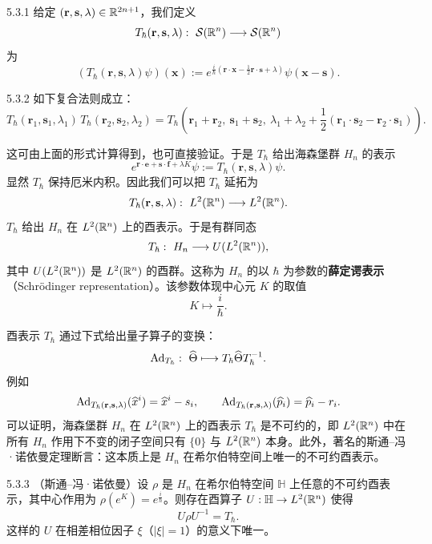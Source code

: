 \begin{definition}{5.3.1}
  给定 $(\mathbf r,\mathbf s,\lambda)\in\mathbb{R}^{2n+1}$，我们定义
  \[
  T_\hbar(\mathbf r,\mathbf s,\lambda):\ \mathcal{S}(\R^n)\longrightarrow\mathcal{S}(\R^n)
  \]
  为
  \[
  (T_\hbar(\mathbf r,\mathbf s,\lambda)\psi)(\mathbf x)
  :=e^{\frac{i}{\hbar}\left(\mathbf r\cdot\mathbf x-\frac{1}{2}\mathbf r\cdot\mathbf s+\lambda\right)}
  \psi(\mathbf x-\mathbf s).
  \]
\end{definition}

\begin{proposition}{5.3.2}
  如下复合法则成立：
  \[
  T_\hbar(\mathbf r_1,\mathbf s_1,\lambda_1)\,T_\hbar(\mathbf r_2,\mathbf s_2,\lambda_2)
  =T_\hbar\left(\mathbf r_1+\mathbf r_2,\ \mathbf s_1+\mathbf s_2,\ 
  \lambda_1+\lambda_2+\frac{1}{2}(\mathbf r_1\cdot\mathbf s_2-\mathbf r_2\cdot\mathbf s_1)\right).
  \]
\end{proposition}

这可由上面的形式计算得到，也可直接验证。于是 $T_\hbar$ 给出海森堡群 $H_n$ 的表示
\[
e^{\mathbf r\cdot\mathbf e+\mathbf s\cdot\mathbf f+\lambda K}\psi
:=T_\hbar(\mathbf r,\mathbf s,\lambda)\psi.
\]
显然 $T_\hbar$ 保持厄米内积。因此我们可以把 $T_\hbar$ 延拓为
\[
T_\hbar(\mathbf r,\mathbf s,\lambda):\ L^2(\mathbb{R}^n)\longrightarrow L^2(\mathbb{R}^n).
\]
$T_\hbar$ 给出 $H_n$ 在 $L^2(\mathbb{R}^n)$ 上的酉表示。于是有群同态
\[
T_\hbar:\ H_n\longrightarrow U(L^2(\mathbb{R}^n)),
\]
其中 $U(L^2(\mathbb{R}^n))$ 是 $L^2(\mathbb{R}^n)$ 的酉群。这称为 $H_n$ 的以 $\hbar$ 为参数的\textbf{薛定谔表示}（Schrödinger representation）。该参数体现中心元 $K$ 的取值
\[
K\longmapsto \frac{i}{\hbar}.
\]

酉表示 $T_\hbar$ 通过下式给出量子算子的变换：
\[
\mathrm{Ad}_{T_\hbar}:\ \widehat{\Theta}\longmapsto T_\hbar\widehat{\Theta} T_\hbar^{-1}.
\]
例如
\[
\mathrm{Ad}_{T_\hbar(\mathbf r,\mathbf s,\lambda)}(\widehat{x}^i)=\widehat{x}^i-s_i,
\qquad
\mathrm{Ad}_{T_\hbar(\mathbf r,\mathbf s,\lambda)}(\widehat{p}_i)=\widehat{p}_i-r_i.
\]
可以证明，海森堡群 $H_n$ 在 $L^2(\mathbb{R}^n)$ 上的酉表示 $T_\hbar$ 是不可约的，即 $L^2(\mathbb{R}^n)$ 中在所有 $H_n$ 作用下不变的闭子空间只有 $\{0\}$ 与 $L^2(\mathbb{R}^n)$ 本身。此外，著名的斯通–冯·诺依曼定理断言：这本质上是 $H_n$ 在希尔伯特空间上唯一的不可约酉表示。

\begin{theorem}{5.3.3}
  （斯通–冯·诺依曼）设 $\rho$ 是 $H_n$ 在希尔伯特空间 $\mathbb{H}$ 上任意的不可约酉表示，其中心作用为 $\rho(e^K)=e^{\frac{i}{\hbar}}$。则存在酉算子 $U:\mathbb{H}\to L^2(\mathbb{R}^n)$ 使得
  \[
  U\rho U^{-1}=T_\hbar.
  \]
  这样的 $U$ 在相差相位因子 $\xi$（$|\xi|=1$）的意义下唯一。
\end{theorem}

